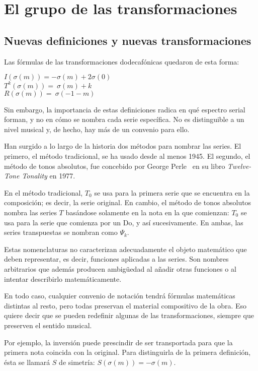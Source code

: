 \section{El grupo de las transformaciones}\label{ch:grupo}
\subsection{Nuevas definiciones y nuevas transformaciones}
		Las f\'ormulas de las transformaciones dodecaf\'onicas quedaron de esta forma:
				
		\begin{center}
		$I(\sigma(m))= -\sigma(m) + 2\sigma(0)$\\
		$T^{k}(\sigma(m))=\ \sigma(m) + k$\\
		$R(\sigma(m))=\ \sigma(-1-m)$
		\end{center}
			
		Sin embargo, la importancia de estas definiciones radica en qu\'e espectro serial forman, y no en c\'omo se nombra cada serie espec\'ifica. No es distinguible a un nivel musical y, de hecho, hay m\'as de un convenio para ello.
		
		Han surgido a lo largo de la historia dos m\'etodos para nombrar las series. El primero, el m\'etodo tradicional, se ha usado desde al menos 1945. El segundo, el m\'etodo de tonos absolutos, fue concebido por George Perle~\cite{perle} en su libro \emph{Twelve-Tone Tonality} en 1977.
		
		En el m\'etodo tradicional, $T_0$ se usa para la primera serie que se encuentra en la composici\'on; es decir, la serie original. En cambio, el m\'etodo de tonos absolutos nombra las series $T$ bas\'andose solamente en la nota en la que comienzan: $T_0$ se usa para la serie que comienza por un Do, y as\'i sucesivamente. En ambas, las series transpuestas se nombran como $\Psi_{k}$.
		
		Estas nomenclaturas no caracterizan adecuadamente el objeto matem\'atico que deben representar, es decir, funciones aplicadas a las series. Son nombres arbitrarios que adem\'as producen ambig\"uedad al a\~nadir otras funciones o al intentar describirlo matem\'aticamente.
		
		En todo caso, cualquier convenio de notaci\'on tendr\'a f\'ormulas matem\'aticas distintas al resto, pero todas preservan el material compositivo de la obra. Eso quiere decir que se pueden redefinir algunas de las transformaciones, siempre que preserven el sentido musical. 
		
		Por ejemplo, la inversi\'on puede prescindir de ser transportada para que la primera nota coincida con la original. Para distinguirla de la primera definici\'on, \'esta se llamar\'a $S$ de simetr\'ia: $S(\sigma(m)) = -\sigma(m)$.
		
